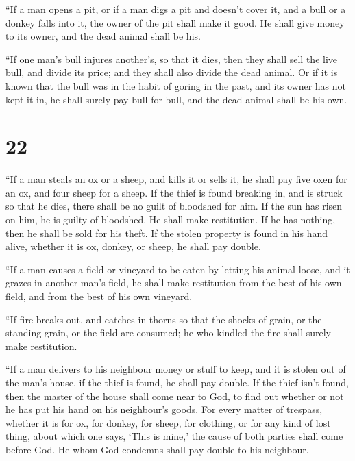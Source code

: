  ``If a man opens a pit, or if a man digs a pit and doesn't
cover it, and a bull or a donkey falls into it,  the owner
of the pit shall make it good. He shall give money to its owner, and the
dead animal shall be his.

 ``If one man's bull injures another's, so that it dies,
then they shall sell the live bull, and divide its price; and they shall
also divide the dead animal.  Or if it is known that the
bull was in the habit of goring in the past, and its owner has not kept
it in, he shall surely pay bull for bull, and the dead animal shall be
his own.

\hypertarget{section-21}{%
\section{22}\label{section-21}}

 ``If a man steals an ox or a sheep, and kills it or sells
it, he shall pay five oxen for an ox, and four sheep for a sheep.
 If the thief is found breaking in, and is struck so that he
dies, there shall be no guilt of bloodshed for him.  If the
sun has risen on him, he is guilty of bloodshed. He shall make
restitution. If he has nothing, then he shall be sold for his theft.
 If the stolen property is found in his hand alive, whether
it is ox, donkey, or sheep, he shall pay double.

 ``If a man causes a field or vineyard to be eaten by
letting his animal loose, and it grazes in another man's field, he shall
make restitution from the best of his own field, and from the best of
his own vineyard.

 ``If fire breaks out, and catches in thorns so that the
shocks of grain, or the standing grain, or the field are consumed; he
who kindled the fire shall surely make restitution.

 ``If a man delivers to his neighbour money or stuff to
keep, and it is stolen out of the man's house, if the thief is found, he
shall pay double.  If the thief isn't found, then the master
of the house shall come near to God, to find out whether or not he has
put his hand on his neighbour's goods.  For every matter of
trespass, whether it is for ox, for donkey, for sheep, for clothing, or
for any kind of lost thing, about which one says, `This is mine,' the
cause of both parties shall come before God. He whom God condemns shall
pay double to his neighbour.

